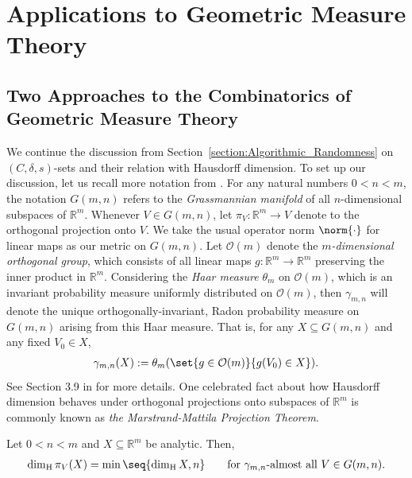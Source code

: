 \chapter[Effectivizing GMT]{Applications to Geometric Measure Theory}\label{chapter:effectivizing_GMT}

\section{Two Approaches to the Combinatorics of Geometric Measure Theory} \label{section:Effective_versions_of_Combinatorial_Proofs}

We continue the discussion from Section~\ref{section:Algorithmic_Randomness} on $(C, \delta, s)$-sets and their relation with Hausdorff dimension. To set up our discussion, let us recall more notation from \cite{Mat95}. For any natural numbers $0 < n < m$, the notation $G(m, n)$ refers to the \textit{Grassmannian manifold} of all $n$-dimensional subspaces of $\mathbb{R}^m$. Whenever $V \in G(m, n)$, let $\pi_V : \mathbb{R}^m \to V$ denote to the orthogonal projection onto $V$. We take the usual operator norm $\norm{\cdot}$ for linear maps as our metric on $G(m, n)$. Let $\mathcal{O}(m)$ denote the \textit{$m$-dimensional orthogonal group}, which consists of all linear maps $g : \mathbb{R}^m \to \mathbb{R}^m$ preserving the inner product in $\mathbb{R}^m$. Considering the \textit{Haar measure} $\theta_m$ on $\mathcal{O}(m)$, which is an invariant probability measure uniformly distributed on $\mathcal{O}(m)$, then $\gamma_{m, n}$ will denote the unique orthogonally-invariant, Radon probability measure on $G(m, n)$ arising from this Haar measure. That is, for any $X \subseteq G(m, n)$ and any fixed $V_0 \in X$,
\begin{align*}
    \gamma_{m, n}(X) :=  \theta_m(\set{g \in \mathcal{O}(m)}{g(V_0) \in X}).
\end{align*}
See Section 3.9 in \cite{Mat95} for more details. One celebrated fact about how Hausdorff dimension behaves under orthogonal projections onto subspaces of $\mathbb{R}^m$ is commonly known as \textit{the Marstrand-Mattila Projection Theorem}.

\begin{theorem}
    \label{theorem:marstrand_projection_original}
    Let $0 < n < m$ and $X \subseteq \mathbb{R}^m$ be analytic. Then,
    \begin{align*}
        \dim_{\operatorname{H}} \pi_V(X) = \min \seq{\dim_{\operatorname{H}} X, n} \qquad \text{for $\gamma_{m, n}$-almost all $V \in G(m, n)$}.
    \end{align*}
\end{theorem}

